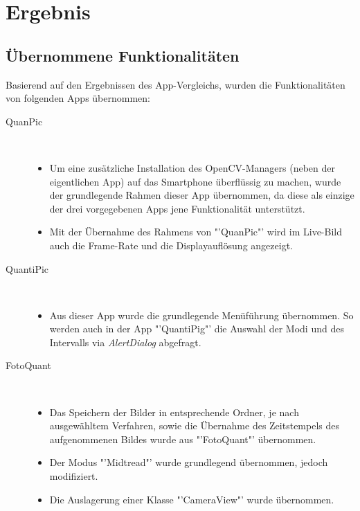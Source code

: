 
\section{Ergebnis}
\subsection{Übernommene Funktionalitäten}

Basierend auf den Ergebnissen des App-Vergleichs, wurden die Funktionalitäten von folgenden Apps übernommen:
\begin{description}
\item[QuanPic]~\par
\begin{itemize}
\item Um eine zusätzliche Installation des OpenCV-Managers (neben der eigentlichen App) auf das Smartphone überflüssig zu machen, wurde der grundlegende Rahmen dieser App übernommen, da diese als einzige der drei vorgegebenen Apps jene Funktionalität unterstützt.
\item Mit der Übernahme des Rahmens von "'QuanPic"' wird im Live-Bild auch die Frame-Rate und die Displayauflösung angezeigt.
\end{itemize}

\item[QuantiPic]~\par
\begin{itemize}
\item Aus dieser App wurde die grundlegende Menüführung übernommen. So werden auch in der App "'QuantiPig"' die Auswahl der Modi und des Intervalls via \textit{AlertDialog} abgefragt.
\end{itemize}

\item[FotoQuant]~\par
\begin{itemize}
\item Das Speichern der Bilder in entsprechende Ordner, je nach ausgewähltem Verfahren, sowie die Übernahme des Zeitstempels des aufgenommenen Bildes wurde aus "'FotoQuant"' übernommen.
\item Der Modus "'Midtread"' wurde grundlegend übernommen, jedoch modifiziert.
\item Die Auslagerung einer Klasse "'CameraView"' wurde übernommen. 
\end{itemize}



\end{description}
